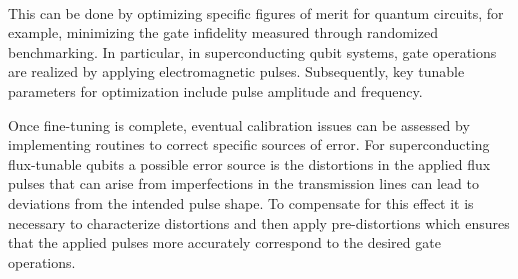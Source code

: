 \paragraph{}

This can be done by optimizing specific figures of merit for quantum circuits, for example, minimizing the gate infidelity measured through randomized benchmarking. 
In particular, in superconducting qubit systems, gate operations are realized by applying electromagnetic pulses. Subsequently, key tunable parameters for optimization include pulse amplitude and frequency. 

Once fine-tuning is complete, eventual calibration issues can be assessed by implementing routines to correct specific sources of error. For superconducting flux-tunable qubits a possible error source is the distortions in the applied flux pulses that can arise from imperfections in the transmission lines can lead to deviations from the intended pulse shape. To compensate for this effect it is necessary to characterize distortions and then apply pre-distortions which ensures that the applied pulses more accurately correspond to the desired gate operations.
